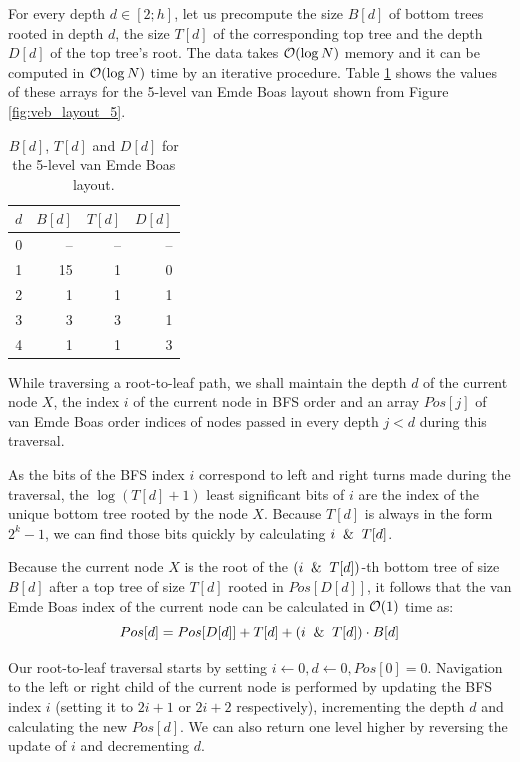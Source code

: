 For every depth $d\in[2;h]$, let us precompute the size $B[d]$ of
bottom trees rooted in depth $d$, the size $T[d]$ of the corresponding
top tree and the depth $D[d]$ of the top tree's root. The data takes $\mathcal{O}(\log
N)$ memory and it can be computed in $\mathcal{O}(\log N)$ time by an iterative procedure.
Table \ref{tab:depth_data_example} shows the values of these arrays
for the 5-level van Emde Boas layout shown from Figure \ref{fig:veb_layout_5}.

\begin{table}[h]
	\centering
	\begin{tabular}{r|r|r|r}
		$d$ & $B[d]$ & $T[d]$ & $D[d]$ \\
		\hline
		0   & --     & --     & --     \\
		1   & 15     & 1      & 0      \\
		2   & 1      & 1      & 1      \\
		3   & 3      & 3      & 1      \\
		4   & 1      & 1      & 3
	\end{tabular}
	\caption{$B[d]$, $T[d]$ and $D[d]$ for the 5-level van Emde
	Boas layout.}
	\label{tab:depth_data_example}
\end{table}

While traversing a root-to-leaf path, we shall maintain the depth
$d$ of the current node $X$, the index $i$ of the current node in BFS order
and an array $Pos[j]$ of van Emde Boas order indices of nodes passed in every
depth $j<d$ during this traversal.

As the bits of the BFS index $i$ correspond to left and right turns made during
the traversal, the $\log(T[d]+1)$ least significant bits of $i$ are the
index of the unique bottom tree rooted by the node $X$. Because $T[d]$ is
always in the form $2^k-1$, we can find those bits quickly by calculating
$i \And T[d]$.

Because the current node $X$ is the root of the $(i \And T[d])$-th
bottom tree of size $B[d]$ after a top tree of size $T[d]$ rooted in
$Pos[D[d]]$, it follows that the van Emde Boas index of the current node can be
calculated in $\mathcal{O}(1)$ time as:
$$Pos[d]=Pos[D[d]] + T[d] + (i \And T[d]) \cdot B[d]$$

Our root-to-leaf traversal starts by setting $i\gets 0, d\gets 0, Pos[0]=0$.
Navigation to the left or right child of the current node is performed
by updating the BFS index $i$ (setting it to $2i+1$ or $2i+2$ respectively),
incrementing the depth $d$ and calculating the new $Pos[d]$.
We can also return one level higher by reversing the update of $i$ and
decrementing $d$.

